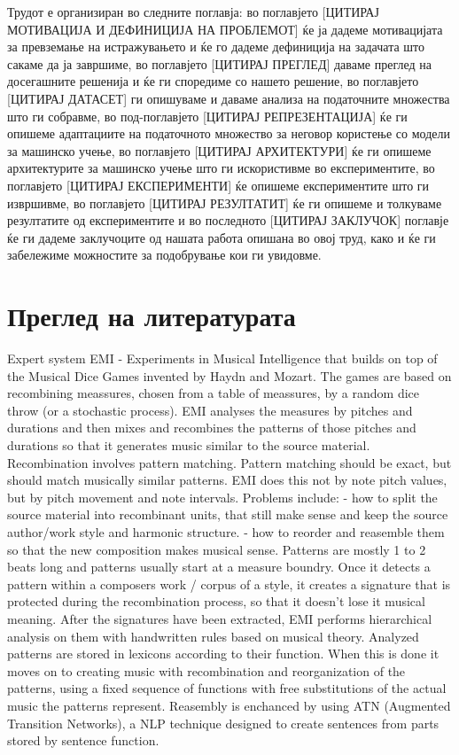 Трудот е организиран во следните поглавја: во поглавјето [ЦИТИРАЈ МОТИВАЦИЈА И ДЕФИНИЦИЈА НА ПРОБЛЕМОТ] ќе ја дадеме мотивацијата за превземање на истражувањето и ќе го дадеме дефиниција на задачата што сакаме да ја завршиме, во поглавјето [ЦИТИРАЈ ПРЕГЛЕД] даваме преглед на досегашните решенија и ќе ги споредиме со нашето решение, во поглавјето [ЦИТИРАЈ ДАТАСЕТ] ги опишуваме и даваме анализа на податочните множества што ги собравме, во под-поглавјето [ЦИТИРАЈ РЕПРЕЗЕНТАЦИЈА] ќе ги опишеме адаптациите на податочното множество за неговор користење со модели за машинско учење, во поглавјето [ЦИТИРАЈ АРХИТЕКТУРИ] ќе ги опишеме архитектурите за машинско учење што ги искористивме во експериментите, во поглавјето [ЦИТИРАЈ ЕКСПЕРИМЕНТИ] ќе опишеме експериментите што ги извршивме, во поглавјето [ЦИТИРАЈ РЕЗУЛТАТИТ] ќе ги опишеме и толкуваме резултатите од експериментите и во последното [ЦИТИРАЈ ЗАКЛУЧОК] поглавје ќе ги дадеме заклучоците од нашата работа опишана во овој труд, како и ќе ги забележиме можностите за подобрување кои ги увидовме.

\chapter{Преглед на литературата}

\cite{Cope1991} Expert system EMI - Experiments in Musical Intelligence that builds on top of the Musical Dice Games invented by Haydn and Mozart. The games are based on recombining meassures, chosen from a table of meassures, by a random dice throw (or a stochastic process). EMI analyses the measures by pitches and durations and then mixes and recombines the patterns of those pitches and durations so that it generates music similar to the source material. Recombination involves pattern matching. Pattern matching should be exact, but should match musically similar patterns. EMI does this not by note pitch values, but by pitch movement and note intervals. Problems include: - how to split the source material into recombinant units, that still make sense and keep the source author/work style and harmonic structure. - how to reorder and reasemble them so that the new composition makes musical sense. Patterns are mostly 1 to 2 beats long and patterns usually start at a measure boundry. Once it detects a pattern within a composers work / corpus of a style, it creates a signature that is protected during the recombination process, so that it doesn't lose it musical meaning. After the signatures have been extracted, EMI performs hierarchical analysis on them with handwritten rules based on musical theory. Analyzed patterns are stored in lexicons according to their function. When this is done it moves on to creating music with recombination and reorganization of the patterns, using a fixed sequence of functions with free substitutions of the actual music the patterns represent. Reasembly is enchanced by using ATN (Augmented Transition Networks), a NLP technique designed to create sentences from parts stored by sentence function.

